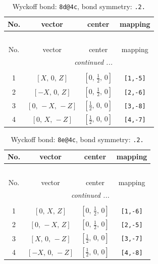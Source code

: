 \documentclass[fleqn,8pt]{jsarticle}
\begin{document}
\begin{longtable}{cccc}
\caption{Wyckoff bond: {\tt 8d@4c}, bond symmetry: {\tt .2.}}
 \\
 \hline \hline
No. & vector & center & mapping \\ \hline \endfirsthead

\multicolumn{3}{l}{\tablename\ \thetable{}} \\
 \hline \hline
No. & vector & center & mapping \\ \hline \endhead

 \hline \hline
\multicolumn{3}{r}{\footnotesize\it continued ...} \\ \endfoot

 \hline \hline
\multicolumn{3}{r}{} \\ \endlastfoot

1 & $\left[ X,\, 0,\, Z \right]$ & $\left[ 0,\, \frac{1}{2},\, 0 \right]$ & {\tt [1,-5]} \\ \hline
2 & $\left[ - X,\, 0,\, Z \right]$ & $\left[ 0,\, \frac{1}{2},\, 0 \right]$ & {\tt [2,-6]} \\ \hline
3 & $\left[ 0,\, - X,\, - Z \right]$ & $\left[ \frac{1}{2},\, 0,\, 0 \right]$ & {\tt [3,-8]} \\ \hline
4 & $\left[ 0,\, X,\, - Z \right]$ & $\left[ \frac{1}{2},\, 0,\, 0 \right]$ & {\tt [4,-7]} \\
\end{longtable}
\renewcommand{\arraystretch}{1.2}
\begin{longtable}{cccc}
\caption{Wyckoff bond: {\tt 8e@4c}, bond symmetry: {\tt .2.}}
 \\
 \hline \hline
No. & vector & center & mapping \\ \hline \endfirsthead

\multicolumn{3}{l}{\tablename\ \thetable{}} \\
 \hline \hline
No. & vector & center & mapping \\ \hline \endhead

 \hline \hline
\multicolumn{3}{r}{\footnotesize\it continued ...} \\ \endfoot

 \hline \hline
\multicolumn{3}{r}{} \\ \endlastfoot

1 & $\left[ 0,\, X,\, Z \right]$ & $\left[ 0,\, \frac{1}{2},\, 0 \right]$ & {\tt [1,-6]} \\ \hline
2 & $\left[ 0,\, - X,\, Z \right]$ & $\left[ 0,\, \frac{1}{2},\, 0 \right]$ & {\tt [2,-5]} \\ \hline
3 & $\left[ X,\, 0,\, - Z \right]$ & $\left[ \frac{1}{2},\, 0,\, 0 \right]$ & {\tt [3,-7]} \\ \hline
4 & $\left[ - X,\, 0,\, - Z \right]$ & $\left[ \frac{1}{2},\, 0,\, 0 \right]$ & {\tt [4,-8]} \\
\end{longtable}
\end{document}
